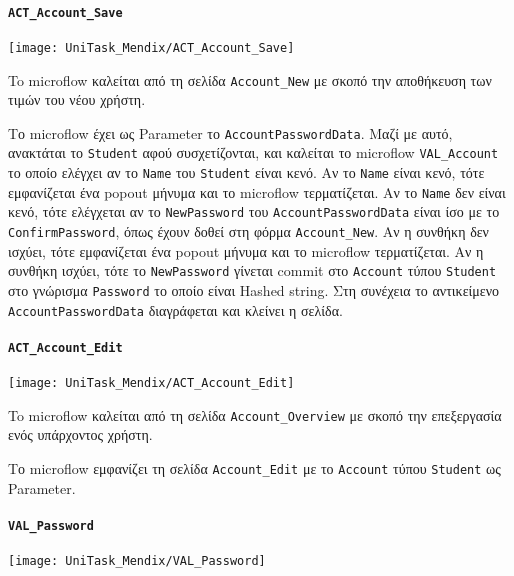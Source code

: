                 \paragraph{\texttt{ACT\_Account\_Save}}
                    \begin{center}
                        \texttt{[image: UniTask\_Mendix/ACT\_Account\_Save]}
                    \end{center}

                    To microflow καλείται από τη σελίδα \texttt{Account\_New} με σκοπό την αποθήκευση των τιμών του νέου χρήστη.

                    Το microflow έχει ως Parameter το \texttt{AccountPasswordData}. Μαζί με αυτό, ανακτάται το \texttt{Student} αφού συσχετίζονται, και καλείται το microflow \texttt{VAL\_Account} το οποίο ελέγχει αν το \texttt{Name} του \texttt{Student} είναι κενό. Αν το \texttt{Name} είναι κενό, τότε εμφανίζεται ένα popout μήνυμα και το microflow τερματίζεται. Αν το \texttt{Name} δεν είναι κενό, τότε ελέγχεται αν το \texttt{NewPassword} του \texttt{AccountPasswordData} είναι ίσο με το \texttt{ConfirmPassword}, όπως έχουν δοθεί στη φόρμα \texttt{Account\_New}. Αν η συνθήκη δεν ισχύει, τότε εμφανίζεται ένα popout μήνυμα και το microflow τερματίζεται. Αν η συνθήκη ισχύει, τότε το \texttt{NewPassword} γίνεται commit στο \texttt{Account} τύπου \texttt{Student} στο γνώρισμα \texttt{Password} το οποίο είναι Hashed string. Στη συνέχεια το αντικείμενο \texttt{AccountPasswordData} διαγράφεται και κλείνει η σελίδα.

                \paragraph{\texttt{ACT\_Account\_Edit}}
                    \begin{center}
                        \texttt{[image: UniTask\_Mendix/ACT\_Account\_Edit]}
                    \end{center}

                    To microflow καλείται από τη σελίδα \texttt{Account\_Overview} με σκοπό την επεξεργασία ενός υπάρχοντος χρήστη.

                    Το microflow εμφανίζει τη σελίδα \texttt{Account\_Edit} με το \texttt{Account} τύπου \texttt{Student} ως Parameter.

                \paragraph{\texttt{VAL\_Password}}
                    \begin{center}
                        \texttt{[image: UniTask\_Mendix/VAL\_Password]}
                    \end{center}

